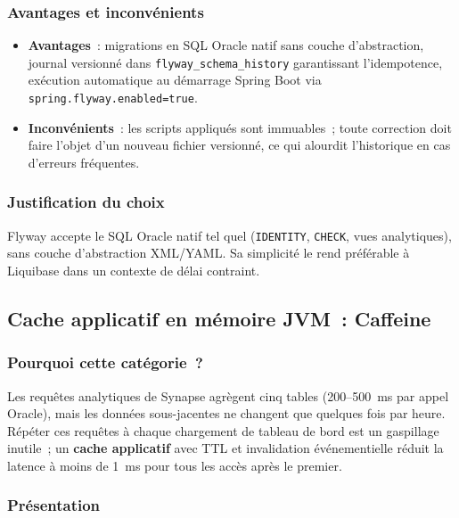 \subsubsection*{Avantages et inconvénients}

\begin{itemize}[leftmargin=*,nosep]
  \item \textbf{Avantages}~: migrations en SQL Oracle natif sans couche d'abstraction,
        journal versionné dans \texttt{flyway\_schema\_history} garantissant l'idempotence,
        exécution automatique au démarrage Spring Boot via \texttt{spring.flyway.enabled=true}.
  \item \textbf{Inconvénients}~: les scripts appliqués sont immuables~; toute correction
        doit faire l'objet d'un nouveau fichier versionné, ce qui alourdit l'historique
        en cas d'erreurs fréquentes.
\end{itemize}

\subsubsection*{Justification du choix}

Flyway accepte le SQL Oracle natif tel quel (\texttt{IDENTITY}, \texttt{CHECK}, vues analytiques), sans couche d'abstraction XML/YAML. Sa simplicité le rend préférable à Liquibase dans un contexte de délai contraint.

\subsection{Cache applicatif en mémoire JVM~: Caffeine}

\subsubsection*{Pourquoi cette catégorie~?}

Les requêtes analytiques de Synapse agrègent cinq tables (200--500~ms par appel Oracle), mais les données sous-jacentes ne changent que quelques fois par heure. Répéter ces requêtes à chaque chargement de tableau de bord est un gaspillage inutile~; un \textbf{cache applicatif} avec TTL et invalidation événementielle réduit la latence à moins de 1~ms pour tous les accès après le premier.

\subsubsection*{Présentation}

